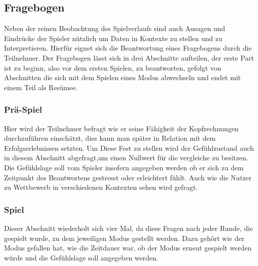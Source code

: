 
\subsection{Fragebogen}
Neben der reinen Beobachtung des Spielverlaufs sind auch Ausagen und Eindrücke der Spieler nützlich um Daten in Kontexte zu stellen und zu Interpretieren. Hierfür eignet sich die Beantwortung eines Fragebogens durch die Teilnehmer. Der Fragebogen lässt sich in drei Abschnitte aufteilen, der erste Part ist zu beginn, also vor dem ersten Spielen, zu beantworten, gefolgt von Abschnitten die sich mit dem Spielen eines Modus abwechseln und endet mit einem Teil als Resümee.
\subsubsection{Prä-Spiel }
Hier wird der Teilnehmer befragt wie er seine Fähigkeit der Kopfrechnungen durchzuführen einschätzt, dies kann man später in Relation mit dem Erfolgserlebnissen setzten. Um Diese Fest zu stellen wird der Gefühlzustand auch in diesem Abschnitt abgefragt,um einen Nullwert für die vergleiche zu besitzen. Die Gefühlslage soll vom Spieler insofern angegeben werden ob er sich zu dem Zeitpunkt des Beantwortens gestresst oder erleichtert fühlt. Auch wie die Nutzer zu Wettbewerb in verschiedenen Kontexten sehen wird gefragt.
\subsubsection{Spiel}
Dieser Abschnitt wiederholt sich vier Mal, da diese Fragen nach jeder Runde, die gespielt wurde, zu dem jeweiligen Modus gestellt werden. Dazu gehört  wie der Modus gefallen hat, wie die Zeitdauer war, ob der Modus erneut gespielt werden würde und die Gefühlslage soll angegeben werden.
